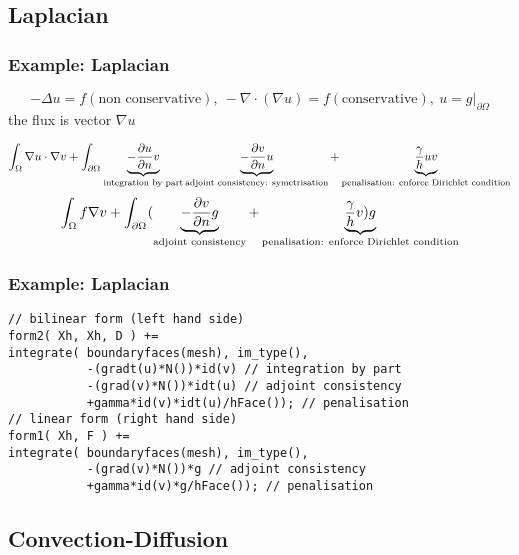 \subsection{Laplacian}
\subsubsection{Example: Laplacian}
  \begin{equation}
    \label{notes:eq:44}
    -\Delta u = f (\text{non conservative}),\ -\nabla\cdot( \nabla u )= f (\text{conservative}),\ u=g|_{\partial \Omega}
  \end{equation}
  the flux is vector $\nabla u$

  \begin{equation}
    \label{notes:eq:51}
    \int_\Omega \nabla u \cdot \nabla v + \int_{\partial {\ensuremath{\Omega^{}}}} \underbrace{-\frac{\partial u}{\partial n}v}_{\text{integration by part}} \underbrace{-\frac{\partial v}{\partial n} u}_{\text{adjoint consistency: symetrisation}}  + \underbrace{\frac{\gamma}{h} u v}_{\text{penalisation: enforce Dirichlet condition}}
  \end{equation}
  \begin{equation}
    \label{notes:eq:52}
    \int_\Omega f \nabla v + \int_{\partial {\ensuremath{\Omega^{}}}} (\underbrace{-\frac{\partial v}{\partial n} g}_{\text{adjoint consistency}} + \underbrace{\frac{\gamma}{h} v) g}_{\text{penalisation: enforce Dirichlet condition}}
  \end{equation}


\subsubsection[containsverbatim]{Example: Laplacian}
  \begin{lstlisting}
// bilinear form (left hand side)
form2( Xh, Xh, D ) +=
integrate( boundaryfaces(mesh), im_type(),
           -(gradt(u)*N())*id(v) // integration by part
           -(grad(v)*N())*idt(u) // adjoint consistency
           +gamma*id(v)*idt(u)/hFace()); // penalisation
// linear form (right hand side)
form1( Xh, F ) +=
integrate( boundaryfaces(mesh), im_type(),
           -(grad(v)*N())*g // adjoint consistency
           +gamma*id(v)*g/hFace()); // penalisation
  \end{lstlisting}


\subsection{Convection-Diffusion}
